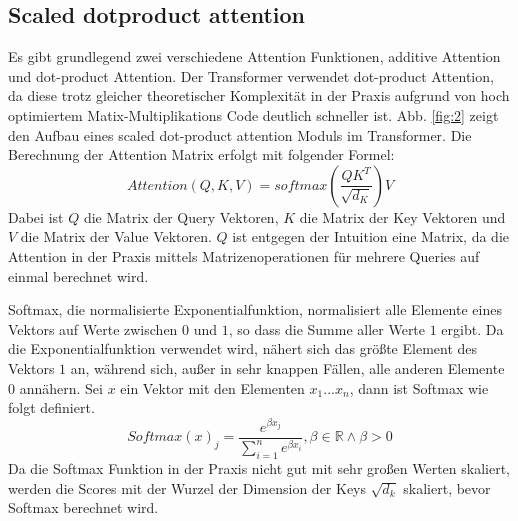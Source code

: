 \documentclass[conference]{IEEEtran}
\begin{document}
\subsection{Scaled dotproduct attention}
Es gibt grundlegend zwei verschiedene Attention Funktionen, additive Attention und dot-product Attention. Der Transformer verwendet dot-product Attention, da diese trotz gleicher theoretischer Komplexität in der Praxis aufgrund von hoch optimiertem Matix-Multiplikations Code deutlich schneller ist. Abb. \ref{fig:2} zeigt den Aufbau eines scaled dot-product attention Moduls im Transformer. Die Berechnung der Attention Matrix erfolgt mit folgender Formel:
\begin{equation} \label{eq:attention}
    Attention(Q,K,V) = softmax(\frac{QK^T}{\sqrt{d_K}})V
\end{equation}
Dabei ist $Q$ die Matrix der Query Vektoren, $K$ die Matrix der Key Vektoren und $V$ die Matrix der Value Vektoren. $Q$ ist entgegen der Intuition eine Matrix, da die Attention in der Praxis mittels Matrizenoperationen für mehrere Queries auf einmal berechnet wird.

Softmax, die normalisierte Exponentialfunktion, normalisiert alle Elemente eines Vektors auf Werte zwischen $0$ und $1$, so dass die Summe aller Werte $1$ ergibt. Da die Exponentialfunktion verwendet wird, nähert sich das größte Element des Vektors $1$ an, während sich, außer in sehr knappen Fällen, alle anderen Elemente $0$ annähern. Sei $x$ ein Vektor mit den Elementen $x_1 ... x_n$, dann ist Softmax wie folgt definiert. \cite{softmax_to_softassign}
\begin{equation} \label{eq:softmax}
    Softmax(x)_j = \frac{e^{\beta x_j}}{\sum_{i = 1}^{n} e^{\beta x_i}}, \beta \in \mathbb{R} \land \beta > 0
\end{equation}
Da die Softmax Funktion in der Praxis nicht gut mit sehr großen Werten skaliert, werden die Scores mit der Wurzel der Dimension der Keys $\sqrt{d_k}$ skaliert, bevor Softmax berechnet wird. \cite{attention_is_all_you_need}
\end{document}

